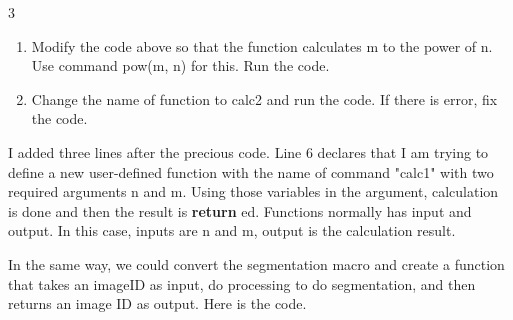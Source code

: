 \begin{indentexercise}
{3}

\begin{enumerate}
\item Modify the code above so that the function calculates m to the power of n. Use command pow(m, n) for this. Run the code.

\item Change the name of function to calc2 and run the code. If there is error, fix the code. 

\end{enumerate}

\end{indentexercise}

I added three lines after the precious code. Line 6 declares that I am trying to define a new user-defined function with the name of command "calc1" with two required arguments n and m. Using those variables in the argument, calculation is done and then the result is \textbf{return} ed. Functions normally has input and output. In this case, inputs are n and m, output is the calculation result.

In the same way, we could convert the segmentation macro and create a function that takes an imageID as input, do processing to do segmentation, and then returns an image ID as output. Here is the code.